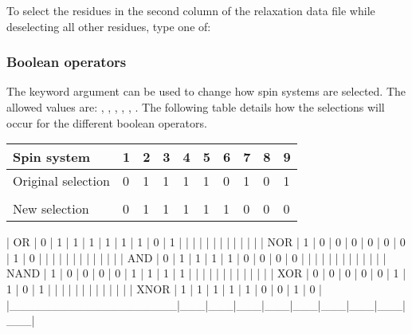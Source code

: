 

 To select the residues in the second column of the relaxation data file  while deselecting all other residues, type one of:  
  



  
 \subsubsection{Boolean operators} 

 The  keyword argument can be used to change how spin systems are selected.  The allowed values are: , , , , , .  The following table details how the selections will occur for the different boolean operators. 
  

 \begin{center} 
 \begin{tabular}{llllllllll} 
 \toprule 
  Spin system & 1 & 2 & 3 & 4 & 5 & 6 & 7 & 8 & 9  \\ 
 \midrule 
  Original selection & 0 & 1 & 1 & 1 & 1 & 0 & 1 & 0 & 1  \\
   &  &  &  &  &  &  &  &  &   \\
  New selection & 0 & 1 & 1 & 1 & 1 & 1 & 0 & 0 & 0  \\
 \bottomrule 
 \end{tabular} 
 \end{center} 
  

 | OR                 | 0 | 1 | 1 | 1 | 1 | 1 | 1 | 0 | 1 | |                    |   |   |   |   |   |   |   |   |   | | NOR                | 1 | 0 | 0 | 0 | 0 | 0 | 0 | 1 | 0 | |                    |   |   |   |   |   |   |   |   |   | | AND                | 0 | 1 | 1 | 1 | 1 | 0 | 0 | 0 | 0 | |                    |   |   |   |   |   |   |   |   |   | | NAND               | 1 | 0 | 0 | 0 | 0 | 1 | 1 | 1 | 1 | |                    |   |   |   |   |   |   |   |   |   | | XOR                | 0 | 0 | 0 | 0 | 0 | 1 | 1 | 0 | 1 | |                    |   |   |   |   |   |   |   |   |   | | XNOR               | 1 | 1 | 1 | 1 | 1 | 0 | 0 | 1 | 0 | |\_\_\_\_\_\_\_\_\_\_\_\_\_\_\_\_\_\_\_\_|\_\_\_|\_\_\_|\_\_\_|\_\_\_|\_\_\_|\_\_\_|\_\_\_|\_\_\_|\_\_\_| 
  

